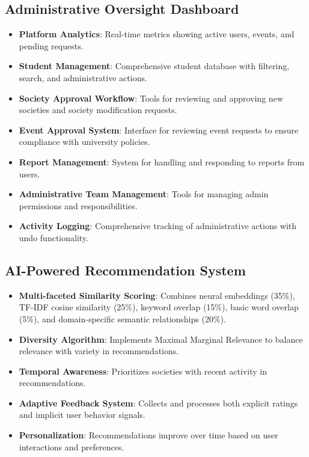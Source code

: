 \subsection{Administrative Oversight Dashboard}
\begin{itemize}
    \item \textbf{Platform Analytics}: Real-time metrics showing active users, events, and pending requests.
    \item \textbf{Student Management}: Comprehensive student database with filtering, search, and administrative actions.
    \item \textbf{Society Approval Workflow}: Tools for reviewing and approving new societies and society modification requests.
    \item \textbf{Event Approval System}: Interface for reviewing event requests to ensure compliance with university policies.
    \item \textbf{Report Management}: System for handling and responding to reports from users.
    \item \textbf{Administrative Team Management}: Tools for managing admin permissions and responsibilities.
    \item \textbf{Activity Logging}: Comprehensive tracking of administrative actions with undo functionality.
\end{itemize}

\subsection{AI-Powered Recommendation System}
\begin{itemize}
    \item \textbf{Multi-faceted Similarity Scoring}: Combines neural embeddings (35\%), TF-IDF cosine similarity (25\%), keyword overlap (15\%), basic word overlap (5\%), and domain-specific semantic relationships (20\%).
    \item \textbf{Diversity Algorithm}: Implements Maximal Marginal Relevance to balance relevance with variety in recommendations.
    \item \textbf{Temporal Awareness}: Prioritizes societies with recent activity in recommendations.
    \item \textbf{Adaptive Feedback System}: Collects and processes both explicit ratings and implicit user behavior signals.
    \item \textbf{Personalization}: Recommendations improve over time based on user interactions and preferences.
\end{itemize}

